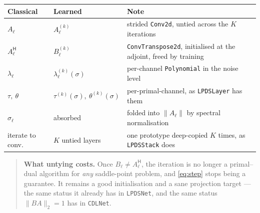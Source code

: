 \documentclass[11pt]{article}
\newcommand{\adj}{{\mathsf H}}
\begin{document}
\begin{table}[h]\centering\small
\begin{tabular}{lll}
\toprule
Classical & Learned & Note \\
\midrule
$A_\ell$        & $A_\ell^{(k)}$ & strided \texttt{Conv2d}, untied across the $K$ iterations \\
$A_\ell^\adj$   & $B_\ell^{(k)}$ & \texttt{ConvTranspose2d}, initialised at the adjoint, freed by training \\
$\lambda_\ell$  & $\lambda_\ell^{(k)}(\sigma)$ & per-channel \texttt{Polynomial} in the noise level \\
$\tau,\ \theta$ & $\tau^{(k)}(\sigma),\ \theta^{(k)}(\sigma)$ & per-primal-channel, as \texttt{LPDSLayer} has them \\
$\sigma_\ell$   & absorbed & folded into $\|A_\ell\|$ by spectral normalisation \\
iterate to conv.& $K$ untied layers & one prototype deep-copied $K$ times, as \texttt{LPDSStack} does \\
\bottomrule
\end{tabular}
\end{table}

\begin{quote}\color{flag}
\textbf{What untying costs.} Once $B_\ell \ne A_\ell^\adj$, the iteration is no longer a primal--dual
algorithm for \emph{any} saddle-point problem, and \eqref{eq:step} stops being a guarantee. It remains a good
initialisation and a sane projection target --- the same status it already has in \texttt{LPDSNet}, and the
same status $\|BA\|_2 = 1$ has in \texttt{CDLNet}.
\end{quote}
\end{document}
